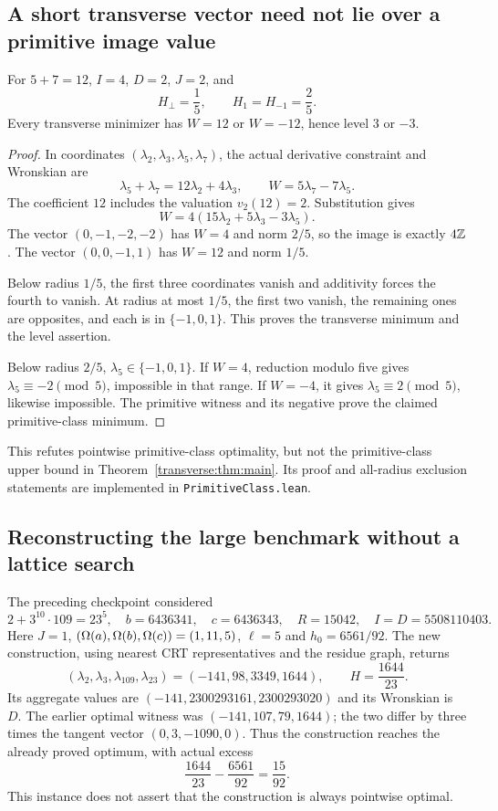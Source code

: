 \subsection{A short transverse vector need not lie over a primitive image value}
\begin{proposition}\label{transverse:prop:five}
For $5+7=12$, $I=4$, $D=2$, $J=2$, and
\[
 H_\perp=\frac15,\qquad H_1=H_{-1}=\frac25.
\]
Every transverse minimizer has $W=12$ or $W=-12$, hence level $3$ or $-3$.
\end{proposition}
\begin{proof}
In coordinates $(\lambda_2,\lambda_3,\lambda_5,\lambda_7)$, the actual derivative constraint and Wronskian are
\[
 \lambda_5+\lambda_7=12\lambda_2+4\lambda_3,
 \qquad W=5\lambda_7-7\lambda_5.
\]
The coefficient $12$ includes the valuation $v_2(12)=2$. Substitution gives
\[
 W=4(15\lambda_2+5\lambda_3-3\lambda_5).
\]
The vector $(0,-1,-2,-2)$ has $W=4$ and norm $2/5$, so the image is exactly $4\mathbb Z$. The vector $(0,0,-1,1)$ has $W=12$ and norm $1/5$.

Below radius $1/5$, the first three coordinates vanish and additivity forces the fourth to vanish. At radius at most $1/5$, the first two vanish, the remaining ones are opposites, and each is in $\{-1,0,1\}$. This proves the transverse minimum and the level assertion.

Below radius $2/5$, $\lambda_5\in\{-1,0,1\}$. If $W=4$, reduction modulo five gives $\lambda_5\equiv-2\pmod5$, impossible in that range. If $W=-4$, it gives $\lambda_5\equiv2\pmod5$, likewise impossible. The primitive witness and its negative prove the claimed primitive-class minimum.
\end{proof}
This refutes pointwise primitive-class optimality, but not the primitive-class upper bound in Theorem~\ref{transverse:thm:main}. Its proof and all-radius exclusion statements are implemented in \texttt{PrimitiveClass.lean}.

\subsection{Reconstructing the large benchmark without a lattice search}
The preceding checkpoint considered
\[
 2+3^{10}\cdot109=23^5,
 \quad b=6436341,\quad c=6436343,
 \quad R=15042,\quad I=D=5508110403.
\]
Here $J=1$, $(\Omega(a),\Omega(b),\Omega(c))=(1,11,5)$, $\ell=5$ and $h_0=6561/92$. The new construction, using nearest CRT representatives and the residue graph, returns
\begin{equation}\label{transverse:eq:newwitness}
 (\lambda_2,\lambda_3,\lambda_{109},\lambda_{23})
 =(-141,98,3349,1644),
 \qquad H=\frac{1644}{23}.
\end{equation}
Its aggregate values are $(-141,2300293161,2300293020)$ and its Wronskian is $D$. The earlier optimal witness was $(-141,107,79,1644)$; the two differ by three times the tangent vector $(0,3,-1090,0)$. Thus the construction reaches the already proved optimum, with actual excess
\[
 \frac{1644}{23}-\frac{6561}{92}=\frac{15}{92}.
\]
This instance does not assert that the construction is always pointwise optimal.

